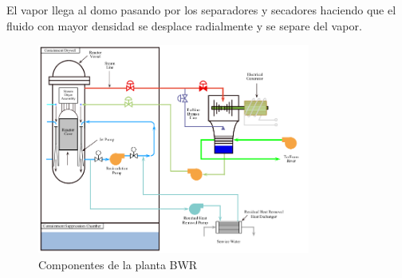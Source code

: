 \documentclass[]{article}
\begin{document}
El vapor  llega al domo pasando por los separadores y secadores haciendo que el fluido con mayor densidad se desplace radialmente y se separe del vapor.\\

\begin{figure}[h!]
	\centering
	\includegraphics[width=0.8\textwidth]{ReactorBWR.png}
	\caption{Componentes de la planta BWR}
	\label{fig:ReactorBWR}
\end{figure}




\end{document}
